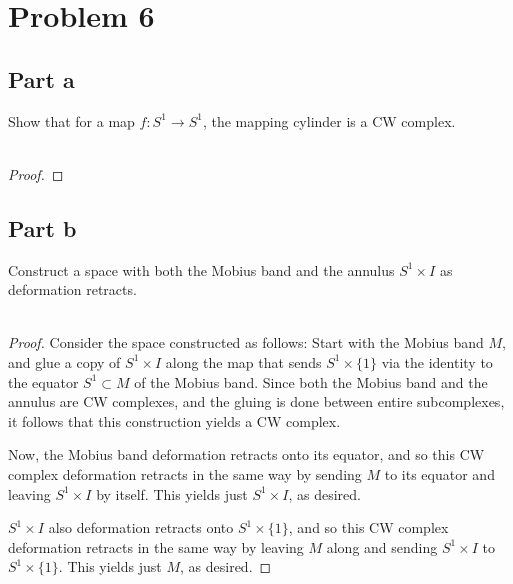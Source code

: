 \documentclass[fontsize=11pt]{scrartcl} %
\numberwithin{equation}{section} %
\numberwithin{figure}{section} %
\numberwithin{table}{section} %
\begin{document}
\section*{Problem 6}
\subsection*{Part a}
Show that for a map $f:S^1\to S^1$, the mapping cylinder is a CW complex.
\\
\\
\begin{proof}
    
\end{proof}

\subsection*{Part b}
Construct a space with both the Mobius band and the annulus $S^1\times I$ as
deformation retracts.
\\
\\
\begin{proof}
    Consider the space constructed as follows:
    Start with the Mobius band $M$, and glue a copy of $S^1\times I$ along the map
    that sends $S^1\times \{1\}$ via the identity to the equator $S^1\subset M$ of the
    Mobius band. Since both the Mobius band and the annulus are CW complexes,
    and the gluing is done between entire subcomplexes, it follows that this
    construction yields a CW complex.

    Now, the Mobius band deformation retracts onto its equator, and so this CW
    complex deformation retracts in the same way by sending $M$ to its equator
    and leaving $S^1\times I$ by itself. This yields just $S^1\times I$, as
    desired.

    $S^1\times I$ also deformation retracts onto $S^1\times \{1\}$, and so this
    CW complex deformation retracts in the same way by leaving $M$ along and
    sending $S^1\times I$ to $S^1\times \{1\}$. This yields just $M$, as
    desired.
\end{proof}
\end{document}
